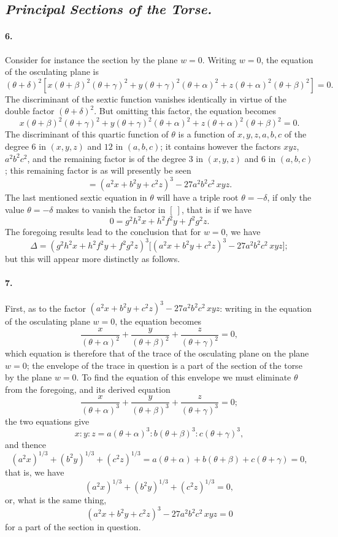 \documentclass[11pt,a4paper]{article}
\begin{document}
\subsection*{\textit{Principal Sections of the Torse.}}

\paragraph{6.}
Consider for instance the section by the plane $w = 0$. Writing $w = 0$, the equation
of the osculating plane is
\[
(\theta + \delta)^2 \left[ x(\theta + \beta)^2(\theta + \gamma)^2
 + y(\theta + \gamma)^2(\theta + \alpha)^2
 + z(\theta + \alpha)^2(\theta + \beta)^2 \right] = 0.
\]
The discriminant of the sextic function vanishes identically in virtue of the double
factor $(\theta + \delta)^2$. But omitting this factor, the equation becomes
\[
x(\theta + \beta)^2(\theta + \gamma)^2 + y(\theta + \gamma)^2(\theta + \alpha)^2
+ z(\theta + \alpha)^2(\theta + \beta)^2 = 0.
\]
The discriminant of this quartic function of $\theta$ is a function of $x, y, z, a, b, c$
of the degree $6$ in $(x, y, z)$ and $12$ in $(a, b, c)$; it contains however the factors
$xyz$, $a^2 b^2 c^2$, and the remaining factor is of the degree $3$ in $(x, y, z)$ and
$6$ in $(a, b, c)$; this remaining factor is as will presently be seen
\[
= (a^2 x + b^2 y + c^2 z)^3 - 27 a^2 b^2 c^2 \, xyz.
\]
The last mentioned sextic equation in $\theta$ will have a triple root $\theta = -\delta$,
if only the value $\theta = -\delta$ makes to vanish the factor in $[\ ]$, that is if we have
\[
0 = g^2 h^2 x + h^2 f^2 y + f^2 g^2 z.
\]
The foregoing results lead to the conclusion that for $w = 0$, we have
\[
\Delta = (g^2 h^2 x + h^2 f^2 y + f^2 g^2 z)^3
\bigl[ (a^2 x + b^2 y + c^2 z)^3 - 27 a^2 b^2 c^2 \, xyz \bigr];
\]
but this will appear more distinctly as follows.

\paragraph{7.}
First, as to the factor $(a^2 x + b^2 y + c^2 z)^3 - 27 a^2 b^2 c^2 \, xyz$: writing in
the equation of the osculating plane $w = 0$, the equation becomes
\[
\frac{x}{(\theta + \alpha)^2} + \frac{y}{(\theta + \beta)^2} + \frac{z}{(\theta + \gamma)^2} = 0,
\]
which equation is therefore that of the trace of the osculating plane on the plane
$w = 0$; the envelope of the trace in question is a part of the section of the torse by
the plane $w = 0$. To find the equation of this envelope we must eliminate $\theta$ from
the foregoing, and its derived equation
\[
\frac{x}{(\theta + \alpha)^3} + \frac{y}{(\theta + \beta)^3} + \frac{z}{(\theta + \gamma)^3} = 0;
\]
the two equations give
\[
x : y : z = a(\theta + \alpha)^3 : b(\theta + \beta)^3 : c(\theta + \gamma)^3,
\]
and thence
\[
(a^2 x)^{1/3} + (b^2 y)^{1/3} + (c^2 z)^{1/3}
 = a(\theta + \alpha) + b(\theta + \beta) + c(\theta + \gamma) = 0,
\]
that is, we have
\[
(a^2 x)^{1/3} + (b^2 y)^{1/3} + (c^2 z)^{1/3} = 0,
\]
or, what is the same thing,
\[
(a^2 x + b^2 y + c^2 z)^3 - 27 a^2 b^2 c^2 \, xyz = 0
\]
for a part of the section in question.
\end{document}
